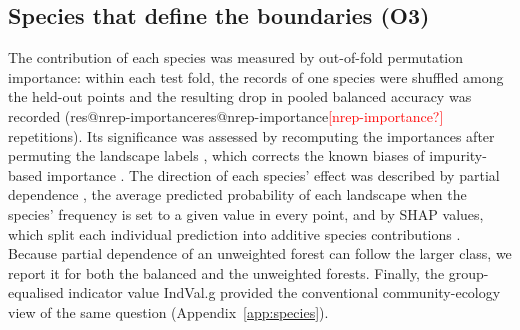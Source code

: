\documentclass[10pt,a4paper,twocolumn]{article}
\makeatletter
\newcommand{\res}[1]{\ifcsname res@#1\endcsname\csname res@#1\endcsname\else\textcolor{red}{[#1?]}\fi}
\makeatother
\begin{document}
\subsection{Species that define the boundaries (O3)}\label{sec:mspecies}
The contribution of each species was measured by out-of-fold permutation importance: within each
test fold, the records of one species were shuffled among the held-out points and the resulting drop
in pooled balanced accuracy was recorded (\res{nrep-importance} repetitions). Its significance was
assessed by recomputing the importances after permuting the landscape labels
\citep[\res{nperm-importance} permutations;][]{altmann2010}, which corrects the known biases of
impurity-based importance \citep{strobl2007}. The direction of each species' effect was described
by partial dependence \citep{friedman2001}, the average predicted probability of each landscape when
the species' frequency is set to a given value in every point, and by SHAP values, which split each
individual prediction into additive species contributions \citep{lundberg2017,lundberg2020}. Because
partial dependence of an unweighted forest can follow the larger class, we report it for both the
balanced and the unweighted forests. Finally, the group-equalised indicator value IndVal.g
\citep{dufrene1997,decaceres2009} provided the conventional community-ecology view of the same
question (Appendix~\ref{app:species}).
\end{document}
